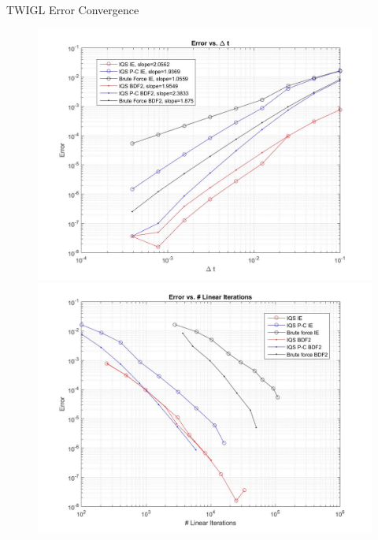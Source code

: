 \documentclass[8pt]{beamer}
\begin{document}
\begin{frame}{TWIGL Error Convergence}

\centering
\begin{figure}[h]
\hspace*{-14mm} \includegraphics[width=0.55\paperwidth]{figures/TWIGL_ramp_dt.jpg}
\hspace*{-6mm}\includegraphics[width=0.55\paperwidth]{figures/TWIGL_ramp_lin.jpg}
\end{figure}

\end{frame}
\end{document}
